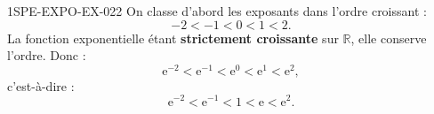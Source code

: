 \begin{corrige}{1SPE-EXPO-EX-022}
On classe d'abord les exposants dans l'ordre croissant :
\[-2 < -1 < 0 < 1 < 2.\]
La fonction exponentielle étant \textbf{strictement croissante} sur $\mathbb{R}$, elle conserve l'ordre. Donc :
\[\mathrm{e}^{-2} < \mathrm{e}^{-1} < \mathrm{e}^0 < \mathrm{e}^1 < \mathrm{e}^2,\]
c'est-à-dire :
\[\mathrm{e}^{-2} < \mathrm{e}^{-1} < 1 < \mathrm{e} < \mathrm{e}^2.\]
\end{corrige}
